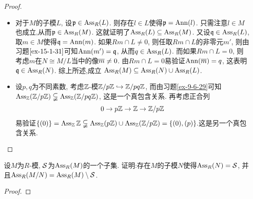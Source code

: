 \documentclass[oneside,a4papar,11pt,UTF8]{book}
\begin{document}
\begin{enumerate}[resume]
  \begin{proof}\,
  \begin{itemize}
    \item
    对于$M$的子模$L$,
    设$\mathfrak{p}\in\operatorname{Ass}_R(L)$.
    则存在$l\in L$使得$\mathfrak{p}=\operatorname{Ann}(l)$.
    只需注意$l\in M$也成立,从而$\mathfrak{p}\in\operatorname{Ass}_R(M)$.
    这就证明了$\operatorname{Ass}_R(L)\subseteq\operatorname{Ass}_R(M)$.
    又设$\mathfrak{q}\in\operatorname{Ass}_R(L)$,
    取$m\in M$使得$\mathfrak{q}=\operatorname{Ann}(m)$.
    如果$Rm\cap L\neq 0$,
    则任取$Rm\cap L$的非零元$m'$,
    则由习题$\ref{ex-15-1-31}$可知$\operatorname{Ann}(m')=\mathfrak{q}$,
    从而$q\in\operatorname{Ass}_R(L)$.
    而如果$Rm\cap L=0$,
    则考虑$m$在$N\cong M/L$当中的像$\overline{m}\neq 0$.
    由$Rm\cap L=0$易验证$\operatorname{Ann}(\overline{m})=q$,
    这表明$\mathfrak{q}\in\operatorname{Ass}_R(N)$.
    综上所述,成立
    $\operatorname{Ass}_R(M)
      \subseteq\operatorname{Ass}_R(N)\cup\operatorname{Ass}_R(L)$.
    \item 设$p,q$为不同素数,
    考虑$\mathbb{Z}$-模$\mathbb{Z}/p\mathbb{Z}\hookrightarrow\mathbb{Z}/pq\mathbb{Z}$,
    而由习题\ref{ex-9-6-29}可知$\operatorname{Ass}_{\mathbb{Z}}(\mathbb{Z}/p\mathbb{Z})
    \subsetneqq\operatorname{Ass}_{\mathbb{Z}}(\mathbb{Z}/pq\mathbb{Z})$,
    这是一个真包含关系.
    再考虑正合列
    \[0\to p\mathbb{Z}\to\mathbb{Z}\to\mathbb{Z}/p\mathbb{Z} \]
    易验证$\{(0)\}=\operatorname{Ass}_{\mathbb{Z}}\mathbb{Z}\subsetneqq
    \operatorname{Ass}_{\mathbb{Z}}(p\mathbb{Z})\cup\operatorname{Ass}_{\mathbb{Z}}(\mathbb{Z}/p\mathbb{Z})
    =\{(0),(p)\}$.这是另一个真包含关系.
  \end{itemize}
  \end{proof}

  \begin{prob}\label{ex-15-1-35}
    设$M$为$R$-模, $\mathcal{S}$为$\operatorname{Ass}_R(M)$的一个子集.
    证明:存在$M$的子模$N$使得$\operatorname{Ass}_R(N)=\mathcal{S}$,
    并且$\operatorname{Ass}_R(M/N)=\operatorname{Ass}_R(M)\setminus\mathcal{S}$.
  \end{prob}

  \begin{proof}



\end{proof}
\end{enumerate}
\end{document}
